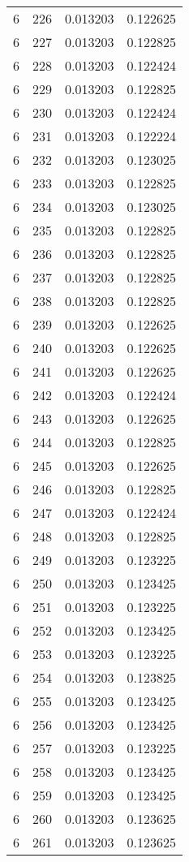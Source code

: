 \begin{longtable}{rrrr}
6 & 226 & 0.013203 & 0.122625 \\
6 & 227 & 0.013203 & 0.122825 \\
6 & 228 & 0.013203 & 0.122424 \\
6 & 229 & 0.013203 & 0.122825 \\
6 & 230 & 0.013203 & 0.122424 \\
6 & 231 & 0.013203 & 0.122224 \\
6 & 232 & 0.013203 & 0.123025 \\
6 & 233 & 0.013203 & 0.122825 \\
6 & 234 & 0.013203 & 0.123025 \\
6 & 235 & 0.013203 & 0.122825 \\
6 & 236 & 0.013203 & 0.122825 \\
6 & 237 & 0.013203 & 0.122825 \\
6 & 238 & 0.013203 & 0.122825 \\
6 & 239 & 0.013203 & 0.122625 \\
6 & 240 & 0.013203 & 0.122625 \\
6 & 241 & 0.013203 & 0.122625 \\
6 & 242 & 0.013203 & 0.122424 \\
6 & 243 & 0.013203 & 0.122625 \\
6 & 244 & 0.013203 & 0.122825 \\
6 & 245 & 0.013203 & 0.122625 \\
6 & 246 & 0.013203 & 0.122825 \\
6 & 247 & 0.013203 & 0.122424 \\
6 & 248 & 0.013203 & 0.122825 \\
6 & 249 & 0.013203 & 0.123225 \\
6 & 250 & 0.013203 & 0.123425 \\
6 & 251 & 0.013203 & 0.123225 \\
6 & 252 & 0.013203 & 0.123425 \\
6 & 253 & 0.013203 & 0.123225 \\
6 & 254 & 0.013203 & 0.123825 \\
6 & 255 & 0.013203 & 0.123425 \\
6 & 256 & 0.013203 & 0.123425 \\
6 & 257 & 0.013203 & 0.123225 \\
6 & 258 & 0.013203 & 0.123425 \\
6 & 259 & 0.013203 & 0.123425 \\
6 & 260 & 0.013203 & 0.123625 \\
6 & 261 & 0.013203 & 0.123625 \\

\end{longtable}
